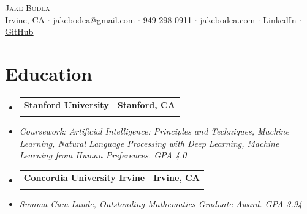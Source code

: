 \documentclass[letterpaper,11pt]{article}
\makeatletter
\newcommand{\resumeSubheadingWithDesc}[4]{
  \vspace{-2pt}\item
    \begin{tabular*}{1.0\textwidth}[t]{l@{\extracolsep{\fill}}r}
      \textbf{#1} & \textbf{\small #2}\\
      \text{#3} & \text{#4}
    \end{tabular*}\vspace{-7pt}
}
\newcommand{\resumeSubHeadingListStart}{\begin{itemize}[leftmargin=0.0in, label={}]}
\newcommand{\resumeSubHeadingListEnd}{\end{itemize}}
\makeatother
\begin{document}
\begin{center}
    {\Huge \scshape Jake Bodea} \\ \vspace{1pt}
    Irvine, CA $\cdot$ \href{mailto:jakebodea@gmail.com}{\underline{jakebodea@gmail.com}} $\cdot$ \href{tel:9492980911}{\underline{949-298-0911}} $\cdot$ \href{https://www.jakebodea.com}{\underline{jakebodea.com}} $\cdot$
    \href{https://www.linkedin.com/in/jakebodea}{\underline{LinkedIn}} $\cdot$
    \href{https://github.com/jakebodea}{\underline{GitHub}}
\end{center}

\section{Education}
\resumeSubHeadingListStart
  \resumeSubheadingWithDesc
    {Stanford University}{Stanford, CA}
    {Graduate Certificate in Artificial Intelligence}{2026}
  \item
  \textit{Coursework: Artificial Intelligence: Principles and Techniques, Machine Learning, Natural Language Processing with Deep Learning, Machine Learning from Human Preferences. GPA 4.0}
  \resumeSubheadingWithDesc
    {Concordia University Irvine}{Irvine, CA}
    {Bachelor of Arts in Mathematics | Minors in Computer Science, Business Data Analytics, and Music}{2022}
  \item
  \textit{Summa Cum Laude, Outstanding Mathematics Graduate Award. GPA 3.94}
\resumeSubHeadingListEnd
\end{document}
